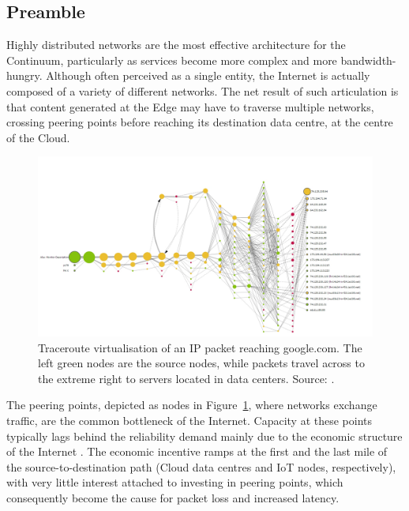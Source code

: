 \subsection{Preamble}
Highly distributed networks are the most effective architecture for the Continuum, particularly as services become more complex and more bandwidth-hungry. Although often perceived as a single entity, the Internet is actually composed of a variety of different networks. 
The net result of such articulation is that content generated at the Edge may have to traverse multiple networks, crossing peering points before reaching its destination data centre, at the centre of the Cloud.

\begin{figure}[ht]
\centering
\includegraphics[width=\columnwidth]{figures/traceroute}
\caption{Traceroute virtualisation of an IP packet reaching google.com. The left green nodes are the source nodes, while packets travel across to the extreme right to servers located in data centers. Source: \cite{traceroute-google}.}
\label{fig:traceroute}
\end{figure}

The peering points, depicted as nodes in Figure~\ref{fig:traceroute}, where networks exchange traffic, are the common bottleneck of the Internet. Capacity at these points typically lags behind the reliability demand mainly due to the economic structure of the Internet \cite{nygren2010akamai}. The economic incentive ramps at the first and the last mile of the source-to-destination path (Cloud data centres and IoT nodes, respectively), with very little interest attached to investing in peering points, which consequently become the cause for packet loss and increased latency.

